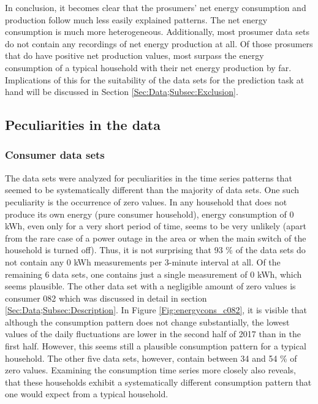 In conclusion, it becomes clear that the prosumers' net energy consumption and production follow much less easily explained patterns. The net energy consumption is much more heterogeneous. Additionally, most prosumer data sets do not contain any recordings of net energy production at all. Of those prosumers that do have positive net production values, most surpass the energy consumption of a typical household with their net energy production by far. Implications of this for the suitability of the data sets for the prediction task at hand will be discussed in Section \ref{Sec:Data;Subsec:Exclusion}.


\subsection{Peculiarities in the data}\label{Sec:Data;Subsec:Peculiarities}

\subsubsection{Consumer data sets}

The data sets were analyzed for peculiarities in the time series patterns that seemed to be systematically different than the majority of data sets. One such peculiarity is the occurrence of zero values. In any household that does not produce its own energy (pure consumer household), energy consumption of 0 kWh, even only for a very short period of time, seems to be very unlikely (apart from the rare case of a power outage in the area or when the main switch of the household is turned off). Thus, it is not surprising that 93 \% of the data sets do not contain any 0 kWh measurements per 3-minute interval at all. Of the remaining 6 data sets, one contains just a single measurement of 0 kWh, which seems plausible. The other data set with a negligible amount of zero values is consumer 082 which was discussed in detail in section \ref{Sec:Data;Subsec:Description}. In Figure \ref{Fig:energycons_c082}, it is visible that although the consumption pattern does not change substantially, the lowest values of the daily fluctuations are lower in the second half of 2017 than in the first half. However, this seems still a plausible consumption pattern for a typical household. The other five data sets, however, contain between 34 and 54 \% of zero values. Examining the consumption time series more closely also reveals, that these households exhibit a systematically different consumption pattern that one would expect from a typical household.

